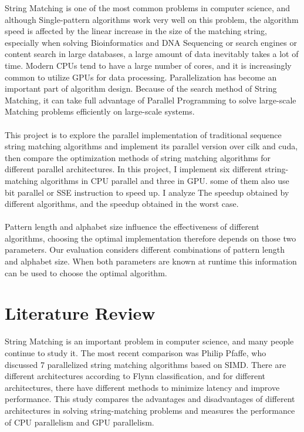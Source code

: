 \documentclass[11pt]{article}       %
\begin{document}
String Matching is one of the most common problems in computer science, and although Single-pattern algorithms work very well on this problem, the algorithm speed is affected by the linear increase in the size of the matching string, especially when solving Bioinformatics and DNA Sequencing or search engines or content search in large databases, a large amount of data inevitably takes a lot of time. Modern CPUs tend to have a large number of cores, and it is increasingly common to utilize GPUs for data processing. Parallelization has become an important part of algorithm design. Because of the search method of String Matching, it can take full advantage of Parallel Programming to solve large-scale Matching problems efficiently on large-scale systems.\\
\\This project is to explore the parallel implementation of traditional sequence string matching algorithms and implement its parallel version over cilk and cuda, then compare the optimization methods of string matching algorithms for different parallel architectures. In this project, I implement six different string-matching algorithms in CPU parallel and three in GPU. some of them also use bit parallel or SSE instruction to speed up. I analyze The speedup obtained by different algorithms, and the speedup obtained in the worst case.\\ 
\\Pattern length and alphabet size influence the effectiveness of different algorithms, choosing the optimal implementation therefore depends on those two parameters. Our evaluation considers different combinations of pattern length and alphabet size. When both parameters are known at runtime this information can be used to choose the optimal algorithm.\\



\section{Literature Review} \label{litrev}

String Matching is an important problem in computer science, and many people continue to study it. The most recent comparison was Philip Pfaffe, who discussed 7 parallelized string matching algorithms based on SIMD\cite{Matching}. There are different architectures according to Flynn classification, and for different architectures, there have different methods to minimize latency and improve performance. This study compares the advantages and disadvantages of different architectures in solving string-matching problems and measures the performance of CPU parallelism and GPU parallelism. \\
\end{document}
